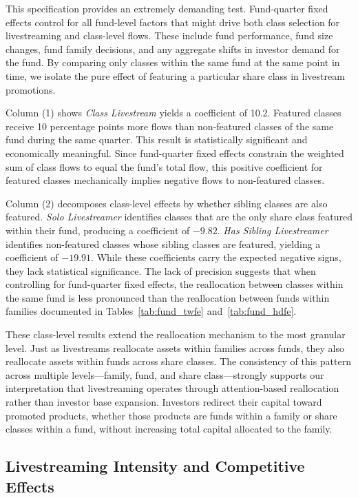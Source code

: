 \documentclass[12pt]{article}
\begin{document}
This specification provides an extremely demanding test. Fund-quarter fixed effects control for all fund-level factors that might drive both class selection for livestreaming and class-level flows. These include fund performance, fund size changes, fund family decisions, and any aggregate shifts in investor demand for the fund. By comparing only classes within the same fund at the same point in time, we isolate the pure effect of featuring a particular share class in livestream promotions.

Column (1) shows \textit{Class Livestream} yields a coefficient of 10.2. Featured classes receive 10 percentage points more flows than non-featured classes of the same fund during the same quarter. This result is statistically significant and economically meaningful. Since fund-quarter fixed effects constrain the weighted sum of class flows to equal the fund's total flow, this positive coefficient for featured classes mechanically implies negative flows to non-featured classes.

Column (2) decomposes class-level effects by whether sibling classes are also featured. \textit{Solo Livestreamer} identifies classes that are the only share class featured within their fund, producing a coefficient of $-9.82$. \textit{Has Sibling Livestreamer} identifies non-featured classes whose sibling classes are featured, yielding a coefficient of $-19.91$. While these coefficients carry the expected negative signs, they lack statistical significance. The lack of precision suggests that when controlling for fund-quarter fixed effects, the reallocation between classes within the same fund is less pronounced than the reallocation between funds within families documented in Tables~\ref{tab:fund_twfe} and~\ref{tab:fund_hdfe}.

These class-level results extend the reallocation mechanism to the most granular level. Just as livestreams reallocate assets within families across funds, they also reallocate assets within funds across share classes. The consistency of this pattern across multiple levels—family, fund, and share class—strongly supports our interpretation that livestreaming operates through attention-based reallocation rather than investor base expansion. Investors redirect their capital toward promoted products, whether those products are funds within a family or share classes within a fund, without increasing total capital allocated to the family.

\subsection{Livestreaming Intensity and Competitive Effects}\label{subsec:intensity_appendix}
\end{document}
